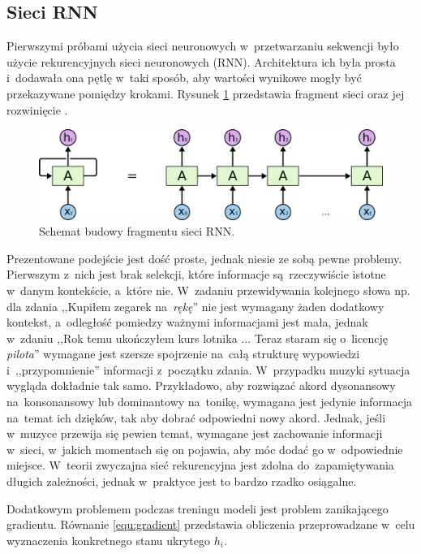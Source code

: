 \documentclass[data-science]{agh-wi} %
\begin{document}
\subsection{Sieci RNN}
Pierwszymi próbami użycia sieci neuronowych w~przetwarzaniu sekwencji było użycie rekurencyjnych sieci neuronowych (RNN). Architektura ich była prosta i~dodawała ona pętlę w~taki sposób, aby wartości wynikowe mogły być przekazywane pomiędzy krokami. Rysunek \ref*{fig:rnn_scheme} przedstawia fragment sieci oraz jej rozwinięcie \cite{Understanding_lstm}.
\begin{figure}[ht!]
    \begin{center}
        \includegraphics[width=0.7\linewidth]{./img/rnn_scheme.png}
    \end{center}
    \caption{Schemat budowy fragmentu sieci RNN.}\label{fig:rnn_scheme}
\end{figure}

Prezentowane podejście jest dość proste, jednak niesie ze sobą pewne problemy. Pierwszym z~nich jest brak selekcji, które informacje są~rzeczywiście istotne w~danym kontekście, a~które nie. W~zadaniu przewidywania kolejnego słowa np. dla zdania ,,Kupiłem zegarek na~\textit{rękę}'' nie jest wymagany żaden dodatkowy kontekst, a~odległość pomiedzy ważnymi informacjami jest mała, jednak w~zdaniu ,,Rok temu ukończyłem kurs lotnika ... Teraz staram się o~licencję \textit{pilota}'' wymagane jest szersze spojrzenie na~całą strukturę wypowiedzi i~,,przypomnienie'' informacji z~początku zdania. W~przypadku muzyki sytuacja wygląda dokładnie tak samo. Przykładowo, aby rozwiązać akord dysonansowy na~konsonansowy lub dominantowy na~tonikę, wymagana jest jedynie informacja na~temat ich dzięków, tak aby dobrać odpowiedni nowy akord. Jednak, jeśli w~muzyce przewija się pewien temat, wymagane jest zachowanie informacji w~sieci, w~jakich momentach się on pojawia, aby móc dodać go w~odpowiednie miejsce. W~teorii zwyczajna sieć rekurencyjna jest zdolna do~zapamiętywania długich zależności, jednak w~praktyce jest to bardzo rzadko osiągalne.

Dodatkowym problemem podczas treningu modeli jest problem zanikającego gradientu. Równanie \ref*{equ:gradient} przedstawia obliczenia przeprowadzane w~celu wyznaczenia konkretnego stanu ukrytego $h_i$.
\end{document}
